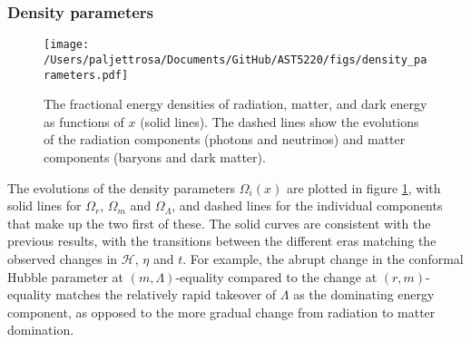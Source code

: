 \documentclass{aa}
\begin{document}
\subsubsection{Density parameters}
\begin{figure}
    \centering
    \texttt{[image: /Users/paljettrosa/Documents/GitHub/AST5220/figs/density\_parameters.pdf]}
    \caption{The fractional energy densities of radiation, matter, and dark energy as functions of $x$ (solid lines). The dashed lines show the evolutions of the radiation components (photons and neutrinos) and matter components (baryons and dark matter).}\label{fig:density parameters}
\end{figure}

The evolutions of the density parameters $\Omega_i(x)$ are plotted in figure \ref{fig:density parameters}, with solid lines for $\Omega_r$, $\Omega_m$ and $\Omega_\Lambda$, and dashed lines for the individual components that make up the two first of these. The solid curves are consistent with the previous results, with the transitions between the different eras matching the observed changes in $\mathcal{H}$, $\eta$ and $t$. For example, the abrupt change in the conformal Hubble parameter at $(m,\Lambda)$-equality compared to the change at $(r,m)$-equality matches the relatively rapid takeover of $\Lambda$ as the dominating energy component, as opposed to the more gradual change from radiation to matter domination. 
\end{document}
